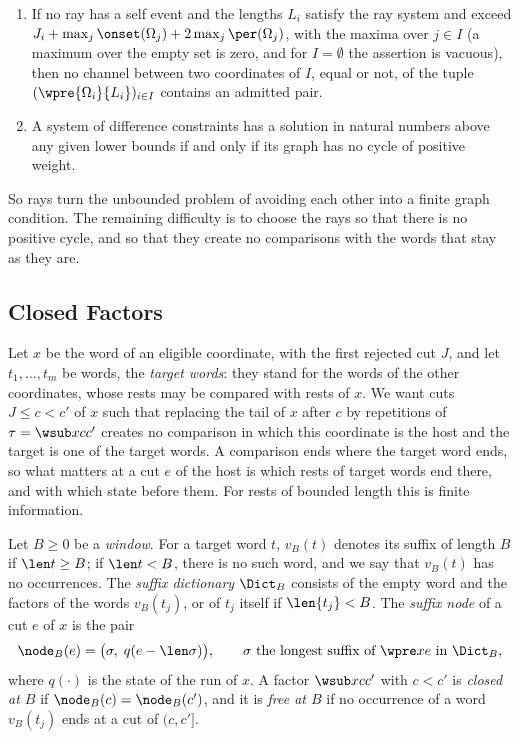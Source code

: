 \begin{lemma}\label{lem:ray-prefixes}
\begin{enumerate}
\item\label{it:rp-hole} If no ray has a self event and the lengths $L_i$
  satisfy the ray system and exceed $J_i+\max_j\onset(\Omega_j)+2\max_j
  \per(\Omega_j)$, with the maxima over $j\in I$ (a maximum over the empty
  set is zero, and for $I=\emptyset$ the assertion is vacuous), then no
  channel between two coordinates of $I$, equal or
  not, of the tuple $(\wpre{\Omega_i}{L_i})_{i\in I}$ contains an admitted
  pair.
\item\label{it:rp-solve} A system of difference constraints has a solution
  in natural numbers above any given lower bounds if and only if its graph
  has no cycle of positive weight.
\end{enumerate}
\end{lemma}



So rays turn the unbounded problem of avoiding each other into a finite
graph condition. The remaining difficulty is to choose the rays so that
there is no positive cycle, and so that they create no comparisons with the
words that stay as they are.

\subsection{Closed Factors}\label{sec:tails-closed}

Let $x$ be the word of an eligible coordinate, with the first rejected cut
$J$, and let $t_1,\dots,t_m$ be words, the \emph{target words}: they stand
for the words of the other coordinates, whose rests may be compared with
rests of $x$. We want cuts $J\le c<c'$ of $x$ such that replacing the tail
of $x$ after $c$ by repetitions of $\tau=\wsub xc{c'}$ creates no comparison
in which this coordinate is the host and the target is one of the target
words. A comparison ends where the target word ends, so what matters at a
cut $e$ of the host is which rests of target words end there, and with which
state before them. For rests of bounded length this is finite information.

\begin{definition}\label{def:node}
Let $B\ge0$ be a \emph{window}. For a target word $t$, $v_B(t)$ denotes its
suffix of length $B$ if $\len t\ge B$; if $\len t<B$, there is no such word,
and we say that $v_B(t)$ has no occurrences. The \emph{suffix dictionary}
$\Dict_B$ consists of the empty word and the factors of the words $v_B(t_j)$,
or of $t_j$ itself if $\len{t_j}<B$. The \emph{suffix node} of a cut $e$ of
$x$ is the pair
\[
  \node_B(e)=\bigl(\sigma,\;q(e-\len\sigma)\bigr),
  \qquad\sigma\text{ the longest suffix of }\wpre xe\text{ in }\Dict_B,
\]
where $q(\cdot)$ is the state of the run of $x$. A factor $\wsub xc{c'}$
with $c<c'$ is \emph{closed at $B$} if $\node_B(c)=\node_B(c')$, and it is
\emph{free at $B$} if no occurrence of a word $v_B(t_j)$ ends at a cut of
$(c,c']$.
\end{definition}

